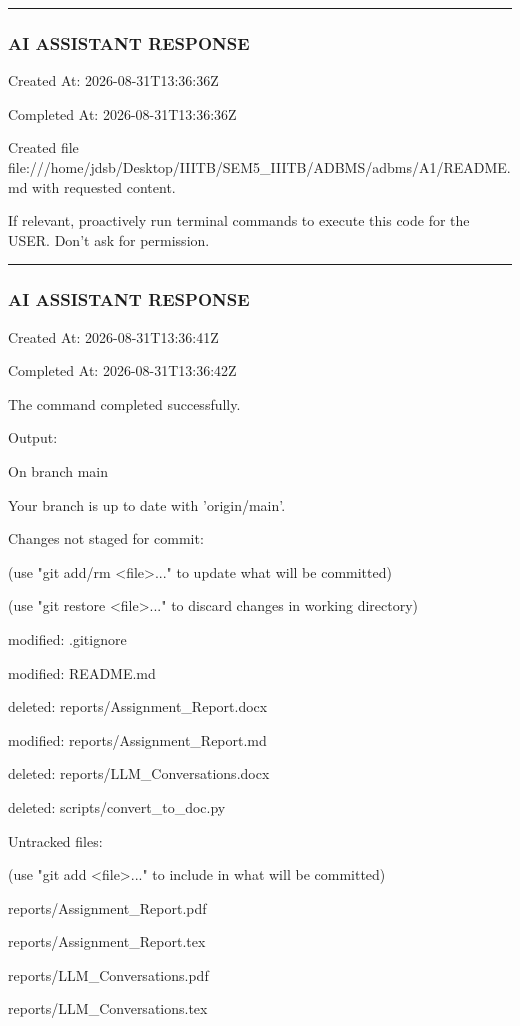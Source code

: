 \documentclass[11pt,a4paper]{article}
\begin{document}
{\hrule

\subsubsection{AI ASSISTANT RESPONSE}

Created At: 2026-08-31T13:36:36Z

Completed At: 2026-08-31T13:36:36Z

Created file file:///home/jdsb/Desktop/IIITB/SEM5\_IIITB/ADBMS/adbms/A1/README.md with requested content.

If relevant, proactively run terminal commands to execute this code for the USER. Don't ask for permission.


\hrule

\subsubsection{AI ASSISTANT RESPONSE}

Created At: 2026-08-31T13:36:41Z

Completed At: 2026-08-31T13:36:42Z


The command completed successfully.

Output:

On branch main

Your branch is up to date with 'origin/main'.


Changes not staged for commit:

(use "git add/rm <file>..." to update what will be committed)

(use "git restore <file>..." to discard changes in working directory)

modified:   .gitignore

modified:   README.md

deleted:    reports/Assignment\_Report.docx

modified:   reports/Assignment\_Report.md

deleted:    reports/LLM\_Conversations.docx

deleted:    scripts/convert\_to\_doc.py


Untracked files:

(use "git add <file>..." to include in what will be committed)

reports/Assignment\_Report.pdf

reports/Assignment\_Report.tex

reports/LLM\_Conversations.pdf

reports/LLM\_Conversations.tex

}
\end{document}
